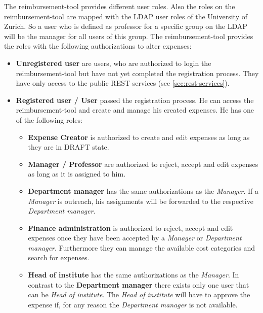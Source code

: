 The reimbursement-tool provides different user roles. Also the roles on the reimbursement-tool are mapped with the LDAP user roles of the University of Zurich. So a user who is defined as professor for a specific group on the LDAP will be the manager for all users of this group. The reimbursement-tool provides the roles with the following authorizations to alter expenses:

\begin{itemize}
    \item \textbf{Unregistered user} are users, who are authorized to login the reimbursement-tool but have not yet completed the registration process. They have only access to the public REST services (see \ref{sec:rest-services}).
    \item \textbf{Registered user / User} passed the registration process. He can access the reimbursement-tool and create and manage his created expenses. He has one of the following roles:

    \begin{itemize}
        \item \textbf{Expense Creator} is authorized to create and edit expenses as long as they are in DRAFT state.

        \item \textbf{Manager / Professor} are authorized to reject, accept and edit expenses as long as it is assigned to him.

        \item \textbf{Department manager} has the same authorizations as the \textit{Manager}. If a \textit{Manager} is outreach, his assignments will be forwarded to the respective \textit{Department manager}.

        \item \textbf{Finance administration} is authorized to reject, accept and edit expenses once they have been accepted by a \textit{Manager} or \textit{Department manager}. Furthermore they can manage the available cost categories and search for expenses.

        \item \textbf{Head of institute} has the same authorizations as the \textit{Manager}. In contrast to the \textbf{Department manager} there exists only one user that can be \textit{Head of institute}. The \textit{Head of institute} will have to approve the expense if, for any reason the \textit{Department manager} is not available.
    \end{itemize}
\end{itemize}


